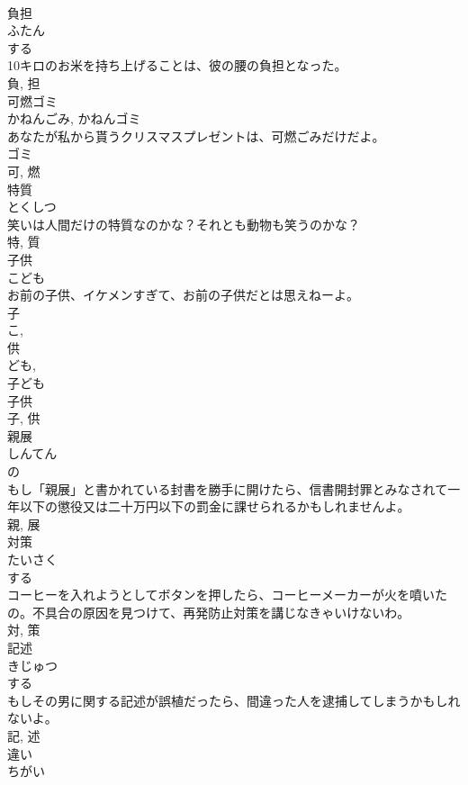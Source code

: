 \documentclass[8pt]{extreport}
\begin{document}
\begin{CJK}{UTF8}{min}
\\	負担	
\\	ふたん	
\\	する 
\\	10キロのお米を持ち上げることは、彼の腰の負担となった。	
\\	負, 担	
\\	可燃ゴミ	
\\	かねんごみ, かねんゴミ	
\\	あなたが私から貰うクリスマスプレゼントは、可燃ごみだけだよ。	
\\	ゴミ 
\\	可, 燃	
\\	特質	
\\	とくしつ	
\\	笑いは人間だけの特質なのかな？それとも動物も笑うのかな？	
\\	特, 質	
\\	子供	
\\	こども	
\\	お前の子供、イケメンすぎて、お前の子供だとは思えねーよ。	
\\	子 
\\	こ, 
\\	供 
\\	ども, 
\\	子ども 
\\	子供 
\\	子, 供	
\\	親展	
\\	しんてん	
\\	の 
\\	もし「親展」と書かれている封書を勝手に開けたら、信書開封罪とみなされて一年以下の懲役又は二十万円以下の罰金に課せられるかもしれませんよ。	
\\	親, 展	
\\	対策	
\\	たいさく	
\\	する 
\\	コーヒーを入れようとしてボタンを押したら、コーヒーメーカーが火を噴いたの。不具合の原因を見つけて、再発防止対策を講じなきゃいけないわ。	
\\	対, 策	
\\	記述	
\\	きじゅつ	
\\	する 
\\	もしその男に関する記述が誤植だったら、間違った人を逮捕してしまうかもしれないよ。	
\\	記, 述	
\\	違い	
\\	ちがい	

\end{CJK}
\end{document}
